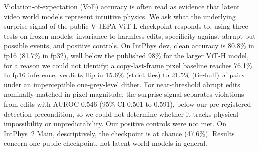 Violation-of-expectation (VoE) accuracy is often read as evidence that latent video world models represent intuitive physics. We ask what the underlying surprise signal of the public V-JEPA ViT-L checkpoint responds to, using three tests on frozen models: invariance to harmless edits, specificity against abrupt but possible events, and positive controls. On IntPhys dev, clean accuracy is 80.8\% in fp16 (81.7\% in fp32), well below the published 98\% for the larger ViT-H model, for a reason we could not identify; a copy-last-frame pixel baseline reaches 76.1\%. In fp16 inference, verdicts flip in 15.6\% (strict ties) to 21.5\% (tie-half) of pairs under an imperceptible one-grey-level dither. For near-threshold abrupt edits nominally matched in pixel magnitude, the surprise signal separates violations from edits with AUROC 0.546 (95\% CI 0.501 to 0.591), below our pre-registered detection precondition, so we could not determine whether it tracks physical impossibility or unpredictability. Our positive controls were not met. On IntPhys~2 Main, descriptively, the checkpoint is at chance (47.6\%). Results concern one public checkpoint, not latent world models in general.
